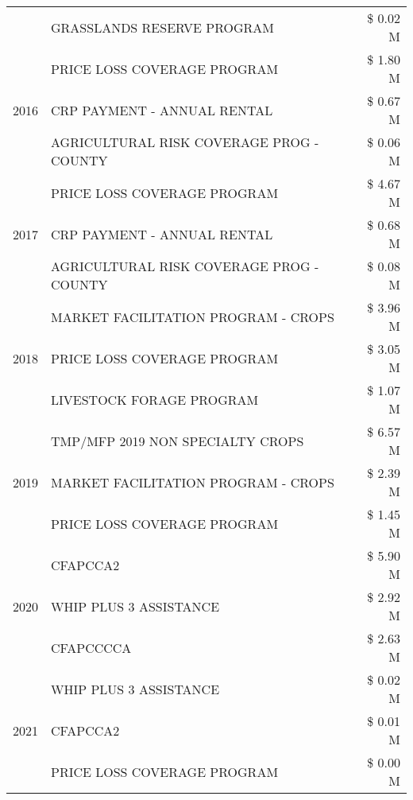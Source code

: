 \begin{tabular}{llr}
 & GRASSLANDS RESERVE PROGRAM & \$ 0.02 M \\
\cline{1-3}
\multirow[t]{3}{*}{2016} & PRICE LOSS COVERAGE PROGRAM & \$ 1.80 M \\
 & CRP PAYMENT - ANNUAL RENTAL & \$ 0.67 M \\
 & AGRICULTURAL RISK COVERAGE PROG - COUNTY & \$ 0.06 M \\
\cline{1-3}
\multirow[t]{3}{*}{2017} & PRICE LOSS COVERAGE PROGRAM & \$ 4.67 M \\
 & CRP PAYMENT - ANNUAL RENTAL & \$ 0.68 M \\
 & AGRICULTURAL RISK COVERAGE PROG - COUNTY & \$ 0.08 M \\
\cline{1-3}
\multirow[t]{3}{*}{2018} & MARKET FACILITATION PROGRAM - CROPS & \$ 3.96 M \\
 & PRICE LOSS COVERAGE PROGRAM & \$ 3.05 M \\
 & LIVESTOCK FORAGE PROGRAM & \$ 1.07 M \\
\cline{1-3}
\multirow[t]{3}{*}{2019} & TMP/MFP 2019 NON SPECIALTY CROPS & \$ 6.57 M \\
 & MARKET FACILITATION PROGRAM - CROPS & \$ 2.39 M \\
 & PRICE LOSS COVERAGE PROGRAM & \$ 1.45 M \\
\cline{1-3}
\multirow[t]{3}{*}{2020} & CFAPCCA2 & \$ 5.90 M \\
 & WHIP PLUS 3 ASSISTANCE & \$ 2.92 M \\
 & CFAPCCCCA & \$ 2.63 M \\
\cline{1-3}
\multirow[t]{3}{*}{2021} & WHIP PLUS 3 ASSISTANCE & \$ 0.02 M \\
 & CFAPCCA2 & \$ 0.01 M \\
 & PRICE LOSS COVERAGE PROGRAM & \$ 0.00 M \\
\cline{1-3}
\bottomrule
\end{tabular}
